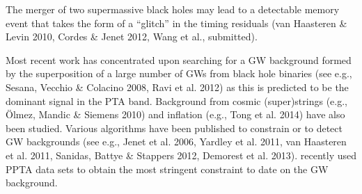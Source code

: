 \documentclass{raa}            %
\begin{document}
\begin{itemize}
{The merger of two supermassive black holes may lead to a detectable memory event that takes the form of a ``glitch'' in the timing residuals (van Haasteren \& Levin 2010\nocite{vl10}, Cordes \& Jenet 2012\nocite{cj12}, Wang et al., submitted).  

Most recent work has concentrated upon searching for a GW background formed by the superposition of a large number of GWs from black hole binaries (see e.g., Sesana, Vecchio \& Colacino 2008\nocite{svc08}, Ravi et al. 2012\nocite{rwh+12}) as this is predicted to be the dominant signal in the PTA band. Background from cosmic (super)strings (e.g., {\"O}lmez, Mandic \& Siemens 2010\nocite{oms10}) and inflation (e.g., Tong et al. 2014\nocite{tzz14}) have also been studied.  Various algorithms have been published to constrain or to detect GW backgrounds (see e.g., Jenet et al. 2006\nocite{jhv+06}, Yardley et al. 2011\nocite{ych+11}, van Haasteren et al. 2011\nocite{vlj+11}, Sanidas, Battye \& Stappers 2012\nocite{sbs12}, Demorest et al. 2013\nocite{dfg+13}).  \cite{src+13} recently used PPTA data sets to obtain the most stringent constraint to date on the GW background.}
\end{itemize}
\end{document}
